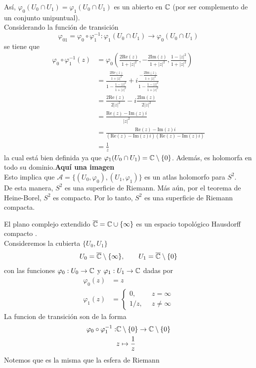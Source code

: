 \begin{example}
	Así, $\varphi_0(U_0\cap U_1)=\varphi_1(U_0\cap U_1)$ es un abierto en $\mathbb{C}$ (por ser complemento de un conjunto unipuntual).\\
	Considerando la función de transición
	\begin{equation*}
		\varphi_{01}=\varphi_0\circ \varphi_1^{-1}:\varphi_1(U_0\cap U_1)\to\varphi_0(U_0\cap U_1)
	\end{equation*}
	se tiene que
	\begin{align*}
		\varphi_0\circ \varphi_1^{-1}(z)&=\varphi_0\left( \frac{2\mathrm{Re}(z)}{1+|z|^2},-\frac{2\mathrm{Im}(z)}{1+|z|^2},\frac{1-|z|^2}{1+|z|^2} \right)\\
		&=\frac{\frac{2\mathrm{Re}(z)}{1+|z|^2}}{1-\frac{1-|z|^2}{1+|z|^2}}+i\frac{-\frac{2\mathrm{Im}(z)}{1+|z|^2}}{1-\frac{1-|z|^2}{1+|z|^2}}\\
		&=\frac{2\mathrm{Re}(z)}{2|z|^2}-i\frac{2\mathrm{Im}(z)}{2|z|^2}\\
		&=\frac{\mathrm{Re}(z)-\mathrm{Im}(z)i}{|z|^2}\\
		&=\frac{\mathrm{Re}(z)-\mathrm{Im}(z)i}{(\mathrm{Re}(z)-\mathrm{Im}(z)i)(\mathrm{Re}(z)-\mathrm{Im}(z)i)}\\
		&=\frac{1}{z}
	\end{align*}
	la cual está bien definida ya que $\varphi_1(U_0\cap U_1)=\mathbb{C}\setminus\{0\}$. Además, es holomorfa en todo su dominio.\textbf{Aquí una imagen}\\
	Esto implica que $\mathscr{A}=\{(U_0,\varphi_0),(U_1,\varphi_1)\}$ es un atlas holomorfo para $S^2$.\\
	De esta manera, $S^2$ es una superficie de Riemann. Más aún, por el teorema de Heine-Borel, $S^2$ es compacto. Por lo tanto, $S^2$ es una superficie de Riemann compacta.
\end{example}

\begin{example}
	El plano complejo extendido $\overline{\mathbb{C}}=\mathbb{C}\cup\{\infty\}$ es un espacio topológico Hausdorff compacto \parencite{schlag}.\\
	Consideremos la cubierta $\{U_0,U_1\}$
	\begin{equation}
		U_0=\overline{\mathbb{C}}\setminus\{\infty\},\qquad U_1=\overline{\mathbb{C}}\setminus\{0\}
	\end{equation}
	con las funciones $\varphi_0:U_0\to\mathbb{C}$ y $\varphi_1:U_1\to\mathbb{C}$ dadas por
	\begin{align*}
		\varphi_0(z)&=z\\
		\varphi_1(z)&=\begin{cases}
			0,&\enspace z=\infty\\
			1/z,&\enspace z\neq \infty
		\end{cases}
	\end{align*}
	La funcion de transición son de la forma
	\begin{align*}
		\varphi_0\circ \varphi_1^{-1}:&\mathbb{C}\setminus\{0\}\to \mathbb{C}\setminus\{0\}\\
		&z\mapsto \frac{1}{z}
	\end{align*}
	Notemos que es la misma que la esfera de Riemann
\end{example}

